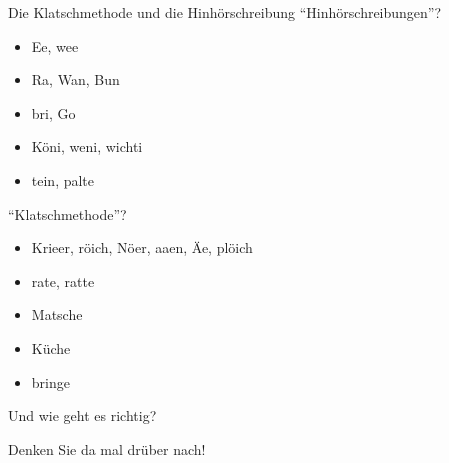 \begin{frame}
  {Die Klatschmethode und die Hinhörschreibung}
  \pause
  "`Hinhörschreibungen"'?\\
  \begin{itemize}[<+->]
    \item Ee, wee
    \item Ra, Wan, Bun
    \item bri, Go
    \item Köni, weni, wichti
    \item {}tein, palte
  \end{itemize}
  \pause
  "`Klatschmethode"'?\\
  \begin{itemize}[<+->]
    \item Krieer, röich, Nöer, aaen, Äe, plöich
    \item rate, ratte
    \item Matsche
    \item Küche
    \item bringe
  \end{itemize}
\end{frame}


\begin{frame}
  {Und wie geht es richtig?}
  \pause
  \Large
  \Zeile\Zeile
  \begin{center}
    Denken Sie da mal drüber nach!
  \end{center}
\end{frame}

